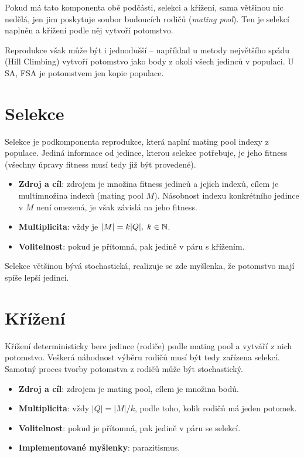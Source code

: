 Pokud má tato komponenta obě podčásti, selekci a křížení, sama většinou nic nedělá, jen jim poskytuje soubor budoucích rodičů (\emph{mating pool}). Ten je selekcí naplněn a křížení podle něj vytvoří potomstvo.

Reprodukce však může být i jednodušší -- například u metody největšího spádu (Hill Climbing) vytvoří potomstvo jako body z okolí všech jedinců v populaci. U SA, FSA je potomstvem jen kopie populace. 

\section{Selekce}

Selekce je podkomponenta reprodukce, která naplní mating pool indexy z populace. Jediná informace od jedince, kterou selekce potřebuje, je jeho fitness (všechny úpravy fitness musí tedy již být provedené).

\begin{itemize}
  \item \textbf{Zdroj a cíl}: zdrojem je množina fitness jedinců a jejich indexů, cílem je multimnožina indexů (mating pool $M$). Násobnost indexu konkrétního jedince v $M$ není omezená, je však závislá na jeho fitness.
  \item \textbf{Multiplicita}: vždy je $|M| = k|Q|,\; k \in \mathbb{N}$.
  \item \textbf{Volitelnost}: pokud je přítomná, pak jedině v páru s křížením.
\end{itemize}

Selekce většinou bývá stochastická, realizuje se zde myšlenka, že potomstvo mají spíše lepší jedinci.

\section{Křížení}

Křížení deterministicky bere jedince (rodiče) podle mating pool a vytváří z nich potomstvo. Veškerá náhodnost výběru rodičů musí být tedy zařízena selekcí. Samotný proces tvorby potomstva z rodičů může být stochastický.

\begin{itemize}
  \item \textbf{Zdroj a cíl}: zdrojem je mating pool, cílem je množina bodů.
  \item \textbf{Multiplicita}: vždy $|Q| = |M|/k$, podle toho, kolik rodičů má jeden potomek.
  \item \textbf{Volitelnost}: pokud je přítomná, pak jedině v páru se selekcí.
  \item \textbf{Implementované myšlenky}: parazitismus.
\end{itemize}


